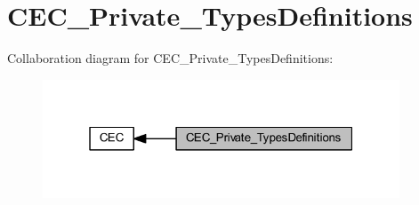 \hypertarget{group___c_e_c___private___types_definitions}{}\section{C\+E\+C\+\_\+\+Private\+\_\+\+Types\+Definitions}
\label{group___c_e_c___private___types_definitions}
Collaboration diagram for C\+E\+C\+\_\+\+Private\+\_\+\+Types\+Definitions\+:
\nopagebreak
\begin{figure}[H]
\begin{center}
\leavevmode
\includegraphics[width=301pt]{group___c_e_c___private___types_definitions}
\end{center}
\end{figure}
